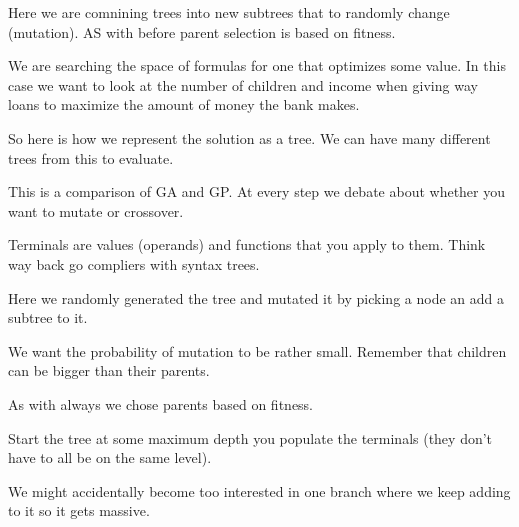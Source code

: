 \documentclass[12pt]{article}
\begin{document}

Here we are comnining trees into new subtrees that to randomly change (mutation). AS with before parent selection is based on fitness.



We are searching the space of formulas for one that optimizes some value. In this case we want to look at the number of children and income when giving way loans to maximize the amount of money the bank makes. 


So here is how we represent the solution as a tree. We can have many different trees from this to evaluate.





This is a comparison of GA and GP. At every step we debate about whether you want to mutate or crossover.


Terminals are values (operands) and functions that you apply to them. Think way back go compliers with syntax trees.
 


Here we randomly generated the tree and mutated it by picking a node an add a subtree to it.


We want the probability of mutation to be rather small. Remember that children can be bigger than their parents.



As with always we chose parents based on fitness. 


Start the tree at some maximum depth you populate the terminals (they don't have to all be on the same level).


We might accidentally become too interested in one branch where we keep adding to it so it gets  massive. 


\end{document}
